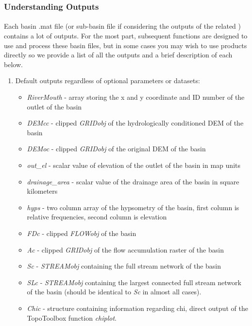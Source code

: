 \subsubsection{Understanding Outputs}
\paragraph{}Each basin .mat file (or sub-basin file if considering the outputs of the related ) contains a lot of outputs. For the most part, subsequent functions are designed to use and process these basin files, but in some cases you may wish to use products directly so we provide a list of all the outputs and a brief description of each below.

\begin{enumerate}
	\item Default outputs regardless of optional parameters or datasets:
	\begin{itemize}
		\item \textit{RiverMouth} - array storing the x and y coordinate and ID number of the outlet of the basin
		\item \textit{DEMcc} - clipped \textit{GRIDobj} of the hydrologically conditioned DEM of the basin
		\item \textit{DEMoc} - clipped \textit{GRIDobj} of the original DEM of the basin
		\item \textit{out\_el} - scalar value of elevation of the outlet of the basin in map units
		\item \textit{drainage\_area} - scalar value of the drainage area of the basin in square kilometers
		\item \textit{hyps} - two column array of the hypsometry of the basin, first column is relative frequencies, second column is elevation
		\item \textit{FDc} - clipped \textit{FLOWobj} of the basin
		\item \textit{Ac} - clipped \textit{GRIDobj} of the flow accumulation raster of the basin
		\item \textit{Sc} - \textit{STREAMobj} containing the full stream network of the basin
		\item \textit{SLc} - \textit{STREAMobj} containing the largest connected full stream network of the basin (should be identical to \textit{Sc} in almost all cases).
		\item \textit{Chic} - structure containing information regarding chi, direct output of the TopoToolbox function \textit{chiplot}.

\end{itemize}
\end{enumerate}

